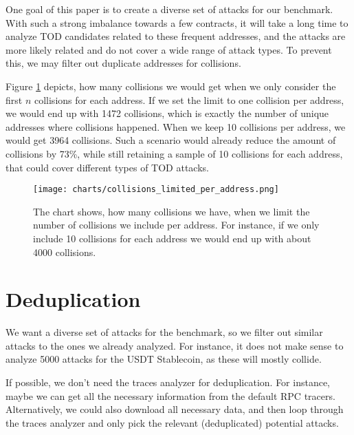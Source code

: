 \documentclass[draft,final]{vutinfth} %
\begin{document}
One goal of this paper is to create a diverse set of attacks for our benchmark. With such a strong imbalance towards a few contracts, it will take a long time to analyze TOD candidates related to these frequent addresses, and the attacks are more likely related and do not cover a wide range of attack types. To prevent this, we may filter out duplicate addresses for collisions.

Figure \ref{fig:collsions_address_limit} depicts, how many collisions we would get when we only consider the first $n$ collisions for each address. If we set the limit to one collision per address, we would end up with 1472 collisions, which is exactly the number of unique addresses where collisions happened. When we keep 10 collisions per address, we would get 3964 collisions. Such a scenario would already reduce the amount of collisions by 73\%, while still retaining a sample of 10 collisions for each address, that could cover different types of TOD attacks.

\begin{figure}[h]
    \centering
    \texttt{[image: charts/collisions\_limited\_per\_address.png]}
    \caption[Limit for collisions per address]{The chart shows, how many collisions we have, when we limit the number of collisions we include per address. For instance, if we only include 10 collisions for each address we would end up with about 4000 collisions.}
    \label{fig:collsions_address_limit}
\end{figure}

\section{Deduplication}


\iffalse
    We want a diverse set of attacks for the benchmark, so we filter out similar attacks to the ones we already analyzed. For instance, it does not make sense to analyze 5000 attacks for the USDT Stablecoin, as these will mostly collide.

    If possible, we don't need the traces analyzer for deduplication. For instance, maybe we can get all the necessary information from the default RPC tracers.
    Alternatively, we could also download all necessary data, and then loop through the traces analyzer and only pick the relevant (deduplicated) potential attacks.
\end{document}
